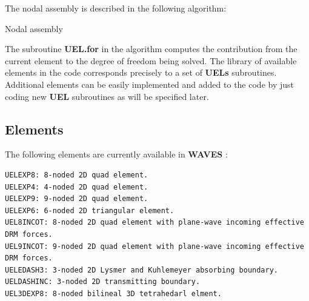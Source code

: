\documentclass[12pt,letterpaper]{article}
\begin{document}
\vspace{1.0 cm}

The nodal assembly is described in the following algorithm:

\vspace{1.0 cm}

\begin{algorithm}[H]
 \SetAlgoLined

\caption{Nodal assembly}
\end{algorithm}

\vspace{1.0 cm}

The subroutine {\bf UEL.for} in the algorithm computes the contribution from the current element to the degree of freedom being solved. The library of available elements in the code corresponds precisely to a set of {\bf UELs} subroutines. Additional elements can be easily implemented and added to the code by just coding new {\bf UEL} subroutines as will be specified later.



\subsection*{Elements}
The following elements are currently available in {\bf WAVES} : 
\begin{verbatim}
UELEXP8: 8-noded 2D quad element.
UELEXP4: 4-noded 2D quad element. 
UELEXP9: 9-noded 2D quad element.
UELEXP6: 6-noded 2D triangular element.
UEL8INCOT: 8-noded 2D quad element with plane-wave incoming effective DRM forces.
UEL9INCOT: 9-noded 2D quad element with plane-wave incoming effective DRM forces.
UELEDASH3: 3-noded 2D Lysmer and Kuhlemeyer absorbing boundary.
UELDASHINC: 3-noded 2D transmitting boundary.
UEL3DEXP8: 8-noded bilineal 3D tetrahedarl elment.
\end{verbatim}
\end{document}

